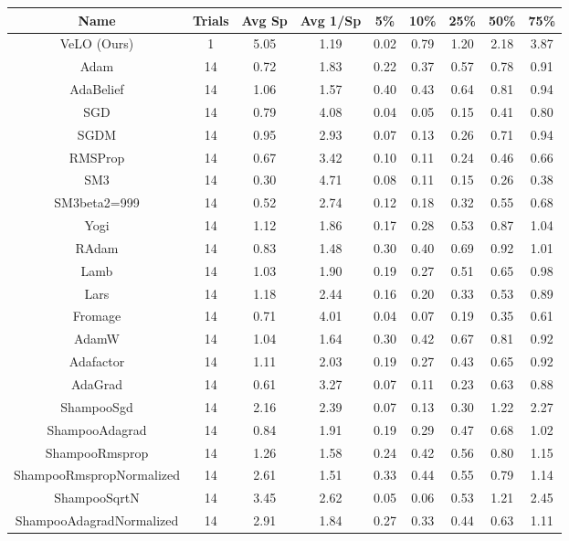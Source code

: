 \footnotesize
\begin{tabular}{||c c c c c c c c c||} 
     \hline
     Name & Trials & Avg Sp & Avg 1/Sp & 5\% & 10\% & 25\% & 50\% & 75\%  \\ [0.5ex] 
     \hline\hline

VeLO (Ours) & 1 &5.05 & 1.19 & 0.02 & 0.79 & 1.20 & 2.18 & 3.87 \\
\hline
Adam & 14 &0.72 & 1.83 & 0.22 & 0.37 & 0.57 & 0.78 & 0.91 \\
AdaBelief & 14 &1.06 & 1.57 & 0.40 & 0.43 & 0.64 & 0.81 & 0.94 \\
SGD & 14 &0.79 & 4.08 & 0.04 & 0.05 & 0.15 & 0.41 & 0.80 \\
SGDM & 14 &0.95 & 2.93 & 0.07 & 0.13 & 0.26 & 0.71 & 0.94 \\
RMSProp & 14 &0.67 & 3.42 & 0.10 & 0.11 & 0.24 & 0.46 & 0.66 \\
SM3 & 14 &0.30 & 4.71 & 0.08 & 0.11 & 0.15 & 0.26 & 0.38 \\
SM3beta2=999 & 14 &0.52 & 2.74 & 0.12 & 0.18 & 0.32 & 0.55 & 0.68 \\
Yogi & 14 &1.12 & 1.86 & 0.17 & 0.28 & 0.53 & 0.87 & 1.04 \\
RAdam & 14 &0.83 & 1.48 & 0.30 & 0.40 & 0.69 & 0.92 & 1.01 \\
Lamb & 14 &1.03 & 1.90 & 0.19 & 0.27 & 0.51 & 0.65 & 0.98 \\
Lars & 14 &1.18 & 2.44 & 0.16 & 0.20 & 0.33 & 0.53 & 0.89 \\
Fromage & 14 &0.71 & 4.01 & 0.04 & 0.07 & 0.19 & 0.35 & 0.61 \\
AdamW & 14 &1.04 & 1.64 & 0.30 & 0.42 & 0.67 & 0.81 & 0.92 \\
Adafactor & 14 &1.11 & 2.03 & 0.19 & 0.27 & 0.43 & 0.65 & 0.92 \\
AdaGrad & 14 &0.61 & 3.27 & 0.07 & 0.11 & 0.23 & 0.63 & 0.88 \\
ShampooSgd & 14 &2.16 & 2.39 & 0.07 & 0.13 & 0.30 & 1.22 & 2.27 \\
ShampooAdagrad & 14 &0.84 & 1.91 & 0.19 & 0.29 & 0.47 & 0.68 & 1.02 \\
ShampooRmsprop & 14 &1.26 & 1.58 & 0.24 & 0.42 & 0.56 & 0.80 & 1.15 \\
ShampooRmspropNormalized & 14 &2.61 & 1.51 & 0.33 & 0.44 & 0.55 & 0.79 & 1.14 \\
ShampooSqrtN & 14 &3.45 & 2.62 & 0.05 & 0.06 & 0.53 & 1.21 & 2.45 \\
ShampooAdagradNormalized & 14 &2.91 & 1.84 & 0.27 & 0.33 & 0.44 & 0.63 & 1.11 \\

\end{tabular}
